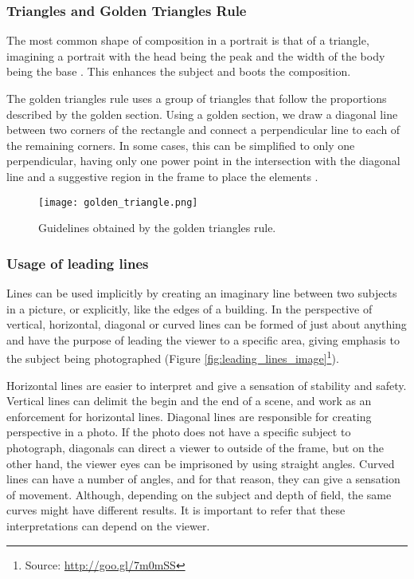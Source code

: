 \subsubsection{Triangles and Golden Triangles Rule}
\label{subsub:rule_triangles}

The most common shape of composition in a portrait is that of a triangle, imagining a portrait with the head being the peak and the width of the body being the base \cite{cleghorn2004portrait}. This enhances the subject and boots the composition.

The golden triangles rule uses a group of triangles that follow the proportions described by the golden section. Using a golden section, we draw a diagonal line between two corners of the rectangle and connect a perpendicular line to each of the remaining corners. In some cases, this can be simplified to only one perpendicular, having only one power point in the intersection with the diagonal line and a suggestive region in the frame to place the elements \cite{Santos}.

\begin{figure}[htbp]
    \centering
	\label{fig:golden_triangle_example}
    \texttt{[image: golden\_triangle.png]}
	\caption{Guidelines obtained by the golden triangles rule.}
	\label{fig:golden_triangle_image}
\end{figure}

\subsubsection{Usage of leading lines}
\label{subsub:leading_lines}

Lines can be used implicitly by creating an imaginary line between two subjects in a picture, or explicitly, like the edges of a building. In the perspective of \citeauthor{kamps2012rules} \cite{kamps2012rules} vertical, horizontal, diagonal or curved lines can be formed of just about anything and have the purpose of leading the viewer to a specific area, giving emphasis to the subject being photographed (Figure \ref{fig:leading_lines_image}\footnote{Source: \url{http://goo.gl/7m0mSS}}).

Horizontal lines are easier to interpret and give a sensation of stability and safety. Vertical lines can delimit the begin and the end of a scene, and work as an enforcement for horizontal lines.
Diagonal lines are responsible for creating perspective in a photo. If the photo does not have a specific subject to photograph, diagonals can direct a viewer to outside of the frame, but on the other hand, the viewer eyes can be imprisoned by using straight angles. 
Curved lines can have a number of angles, and for that reason, they can give a sensation of movement. Although, depending on the subject and depth of field, the same curves might have different results. It is important to refer that these interpretations can depend on the viewer.

